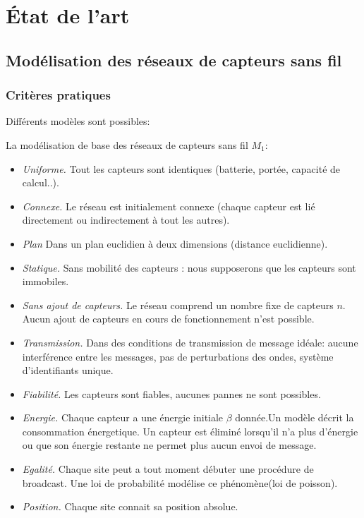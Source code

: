 
\chapter{État de l'art}\label{etat_art}

\section{Modélisation des réseaux de capteurs sans fil}

\subsection{Critères pratiques}\label{modelePratique}

Différents modèles sont possibles:

La modélisation de base des réseaux de capteurs sans fil \textbf{$M_1$}:

\begin{itemize}
 \item \textit{Uniforme.} Tout les capteurs sont identiques (batterie, portée, capacité de calcul..).
 \item \textit{Connexe.} Le réseau est initialement connexe (chaque capteur est lié directement ou indirectement à tout les autres).
 \item \textit{Plan} Dans un plan euclidien à deux dimensions (distance euclidienne).
 \item \textit{Statique.} Sans mobilité des capteurs : nous supposerons que les capteurs sont immobiles.
 \item \textit{Sans ajout de capteurs.} Le réseau comprend un nombre fixe de capteurs $n$. Aucun ajout de capteurs en cours de fonctionnement n'est possible.
 \item \textit{Transmission.} Dans des conditions de transmission de message idéale: aucune interférence entre les messages, pas de perturbations des ondes, système d'identifiants unique.
 \item \textit{Fiabilité.} Les capteurs sont fiables, aucunes pannes ne sont possibles.
 \item \textit{Energie.} Chaque capteur a une énergie initiale $\beta$ donnée.Un modèle décrit la consommation énergetique. Un capteur est éliminé lorsqu'il n'a plus d'énergie ou que son énergie 
 restante ne permet plus aucun envoi de message. 
 \item \textit{Egalité.} Chaque site peut a tout moment débuter une procédure de broadcast. Une loi de probabilité modélise 
 ce phénomène(loi de poisson).
 \item \textit{Position.} Chaque site connait sa position absolue.  \\
\end{itemize}

